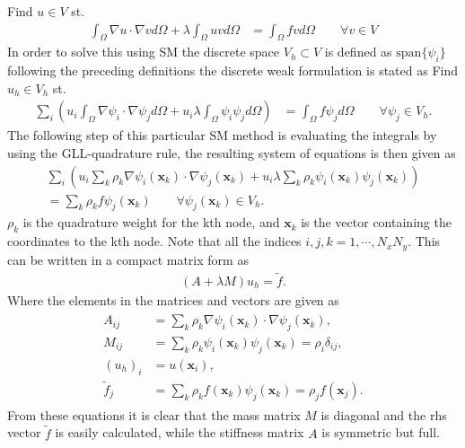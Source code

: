 Find $u\in V$ st. 
%
\begin{align}
    \int_{\Omega}\nabla u \cdot \nabla v d \Omega + \lambda \int_{\Omega} u vd \Omega 
    &= \int_{\Omega}f vd \Omega \qquad \forall v \in V
    \label{eq:Helmholtzweak}
\end{align}
%
In order to solve this using SM the discrete space $V_h \subset V$ is defined as $\text{span}\{\psi_i\}$ following the preceding definitions 
the discrete weak formulation is stated as 
Find $u_h\in V_h$ st. 
%
\begin{align}
    \sum_i\left(  u_i\int_{\Omega}\nabla \psi_i \cdot \nabla \psi_j d \Omega + u_i\lambda \int_{\Omega} \psi_i \psi_jd \Omega \right)
    &= \int_{\Omega}f \psi_jd \Omega \qquad \forall \psi_j \in V_h.
    \label{eq:Helmholtzdiscrete}
\end{align}
%
The following step of this particular SM method is evaluating the integrals by using the GLL-quadrature rule, the resulting system of equations 
is then given as 
%
\begin{align}
    \sum_i\left(  u_i\sum_k \rho_k\nabla \psi_i(\mathbf{x}_{k}) \cdot \nabla \psi_j(\mathbf{x}_{k}) + u_i\lambda \sum_k \rho_k \psi_i(\mathbf{x}_{k}) \psi_j(\mathbf{x}_{k})\right)\\
     = \sum_k \rho_kf \psi_j(\mathbf{x}_{k})\qquad \forall \psi_j(\mathbf{x}_{k}) \in V_h.
    \label{eq:Helmholtzquad}
\end{align}
%
$\rho_k$ is the quadrature weight for the kth node, and $\mathbf{x}_k$ is the vector containing the coordinates to the kth node.
Note that all the indices $i,j,k=1,\cdots,N_xN_y$.
This can be written in a compact matrix form as 
\begin{align}
    (A+\lambda M)u_h = \tilde f.
    \label{eq:Helmholtzmat}
\end{align}
Where the elements in the matrices and vectors are given as 
\begin{align}
    \begin{split}
        A_{ij} &= \sum_k \rho_k\nabla \psi_i(\mathbf{x}_{k}) \cdot \nabla \psi_j(\mathbf{x}_{k}),\\
        M_{ij} &= \sum_k \rho_k \psi_i(\mathbf{x}_{k}) \psi_j(\mathbf{x}_{k}) = \rho_i\delta_{ij},\\
        (u_h)_i & = u(\mathbf{x}_i), \\
        \tilde f_j &= \sum_k \rho_k f(\mathbf{x}_{k}) \psi_j(\mathbf{x}_{k}) = \rho_j f(\mathbf{x}_{j}).
    \end{split}
    \label{eq:Helmholtzmatelem}
\end{align}
From these equations it is clear that the mass matrix $M$ is diagonal and the rhs vector $\tilde f$ is easily calculated, 
while the stiffness matrix $A$ is symmetric but full.

